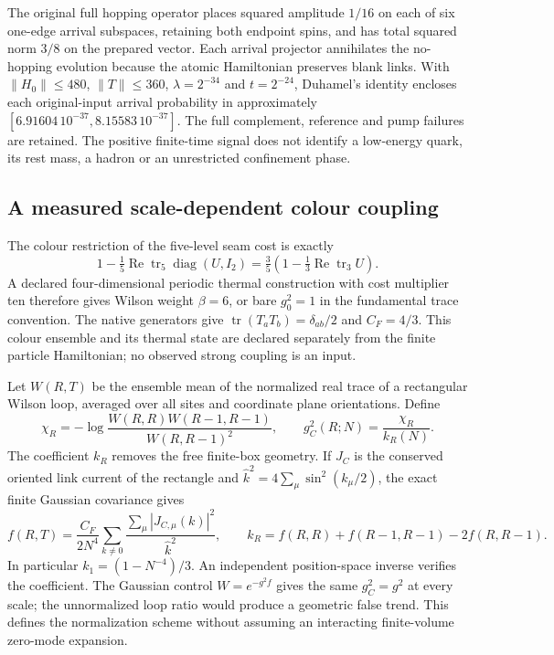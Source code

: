 The original full hopping operator places squared amplitude $1/16$
on each of six one-edge arrival subspaces, retaining both endpoint
spins, and has total squared norm $3/8$ on the prepared vector.
Each arrival projector annihilates the no-hopping evolution because
the atomic Hamiltonian preserves blank links. With
$\|H_0\|\leq480$, $\|T\|\leq360$, $\lambda=2^{-34}$ and
$t=2^{-24}$, Duhamel's identity encloses each original-input arrival
probability in approximately
$[6.91604\,10^{-37},8.15583\,10^{-37}]$.
The full complement, reference and pump failures are retained. The
positive finite-time signal does not identify a low-energy quark,
its rest mass, a hadron or an unrestricted confinement phase.

\subsection{A measured scale-dependent colour coupling}

The colour restriction of the five-level seam cost is exactly
\[
 1-\tfrac15\operatorname{Re}\operatorname{tr}_5
       \operatorname{diag}(U,I_2)
 =\tfrac35\left(1-\tfrac13\operatorname{Re}\operatorname{tr}_3U\right).
\]
A declared four-dimensional periodic thermal construction with cost
multiplier ten therefore gives Wilson weight $\beta=6$, or bare
$g_0^2=1$ in the fundamental trace convention. The native generators
give $\operatorname{tr}(T_aT_b)=\delta_{ab}/2$ and $C_F=4/3$.
This colour ensemble and its thermal state are declared separately
from the finite particle Hamiltonian; no observed strong coupling is
an input.

Let $W(R,T)$ be the ensemble mean of the normalized real trace of
a rectangular Wilson loop, averaged over all sites and coordinate
plane orientations. Define
\[
 \chi_R=-\log\frac{W(R,R)W(R-1,R-1)}{W(R,R-1)^2},\qquad
 g_C^2(R;N)=\frac{\chi_R}{k_R(N)}.
\]
The coefficient $k_R$ removes the free finite-box geometry. If $J_C$
is the conserved oriented link current of the rectangle and
$\widehat k^2=4\sum_\mu\sin^2(k_\mu/2)$, the exact finite Gaussian
covariance gives
\[
 f(R,T)=\frac{C_F}{2N^4}\sum_{k\ne0}
              \frac{\sum_\mu|J_{C,\mu}(k)|^2}{\widehat k^2},
 \qquad
 k_R=f(R,R)+f(R-1,R-1)-2f(R,R-1).
\]
In particular $k_1=(1-N^{-4})/3$. An independent position-space inverse
verifies the coefficient. The Gaussian control $W=e^{-g^2 f}$ gives
the same $g_C^2=g^2$ at every scale; the unnormalized loop ratio would
produce a geometric false trend. This defines the normalization scheme
without assuming an interacting finite-volume zero-mode expansion.

